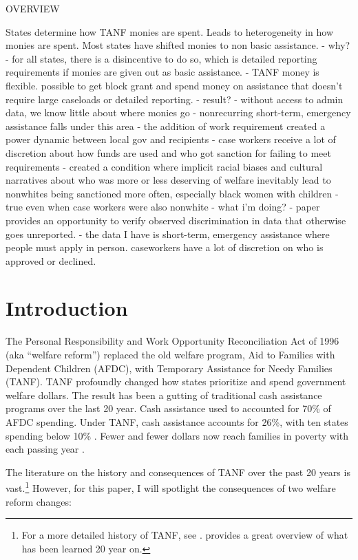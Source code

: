 \documentclass[12pt,letterpaperpaper,]{book}
\begin{document}
OVERVIEW

States determine how TANF monies are spent. Leads to heterogeneity in
how monies are spent. Most states have shifted monies to non basic
assistance. - why? - for all states, there is a disincentive to do so,
which is detailed reporting requirements if monies are given out as
basic assistance. - TANF money is flexible. possible to get block grant
and spend money on assistance that doesn't require large caseloads or
detailed reporting. - result? - without access to admin data, we know
little about where monies go - nonrecurring short-term, emergency
assistance falls under this area - the addition of work requirement
created a power dynamic between local gov and recipients - case workers
receive a lot of discretion about how funds are used and who got
sanction for failing to meet requirements - created a condition where
implicit racial biases and cultural narratives about who was more or
less deserving of welfare inevitably lead to nonwhites being sanctioned
more often, especially black women with children - true even when case
workers were also nonwhite - what i'm doing? - paper provides an
opportunity to verify observed discrimination in data that otherwise
goes unreported. - the data I have is short-term, emergency assistance
where people must apply in person. caseworkers have a lot of discretion
on who is approved or declined.

\chapter{Introduction}\label{introduction}

The Personal Responsibility and Work Opportunity Reconciliation Act of
1996 (aka ``welfare reform'') replaced the old welfare program, Aid to
Families with Dependent Children (AFDC), with Temporary Assistance for
Needy Families (TANF). TANF profoundly changed how states prioritize and
spend government welfare dollars. The result has been a gutting of
traditional cash assistance programs over the last 20 year. Cash
assistance used to accounted for 70\% of AFDC spending. Under TANF, cash
assistance accounts for 26\%, with ten states spending below 10\%
\citep{schott_how_2015}. Fewer and fewer dollars now reach families in
poverty with each passing year \citep{cbpp_chart_2016}.

The literature on the history and consequences of TANF over the past 20
years is vast.\footnote{For a more detailed history of TANF, see
  \citet{ziliak_temporary_2015}. \citet{blank_what_2007} provides a
  great overview of what has been learned 20 year on.} However, for this
paper, I will spotlight the consequences of two welfare reform changes:
\end{document}
